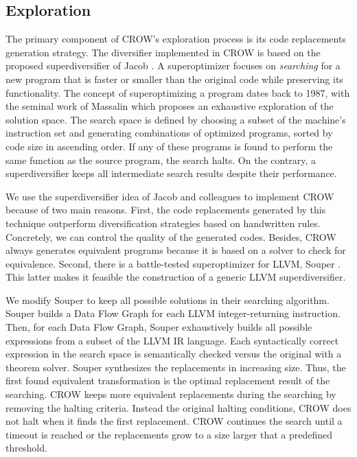 \subsection{Exploration}


The primary component of CROW's exploration process is its code replacements generation strategy. The diversifier implemented in CROW is based on the proposed superdiversifier of Jacob \etal \cite{jacob2008superdiversifier}.
A superoptimizer focuses on \emph{searching} for a new program that is faster or smaller than the original code while preserving its functionality.
The concept of superoptimizing a program dates back to 1987, with the seminal work of Massalin \cite{Massalin1987} which proposes an exhaustive exploration of the solution space. The search space is defined by choosing a subset of the machine's instruction set and generating combinations of optimized programs, sorted by code size in ascending order. If any of these programs is found to perform the same function as the source program, the search halts. On the contrary, a superdiversifier keeps all intermediate search results despite their performance. 

We use the superdiversifier idea of Jacob and colleagues to implement CROW because of two main reasons.
First, the code replacements generated by this technique outperform diversification strategies based on handwritten rules. Concretely, we can control the quality of the generated codes. Besides, CROW always generates equivalent programs because it is based on a solver to check for equivalence. 
Second, there is a battle-tested superoptimizer for LLVM, Souper \cite{Sasnauskas2017Souper:Superoptimizer}. This latter makes it feasible the construction of a generic LLVM superdiversifier. 

We modify Souper to keep all possible solutions in their searching algorithm.
Souper builds a Data Flow Graph for each LLVM integer-returning instruction. 
Then, for each Data Flow Graph, Souper exhaustively builds all possible expressions from a subset of the LLVM IR language.
Each syntactically correct expression in the search space is semantically checked versus the original with a theorem solver. Souper synthesizes the replacements in increasing size. Thus, the first found equivalent transformation is the optimal replacement result of the searching. 
CROW keeps more equivalent replacements during the searching by removing the halting criteria. Instead the original halting conditions, CROW does not halt when it finds the first replacement. CROW continues the search until a timeout is reached or the replacements grow to a size larger that a predefined threshold. 

